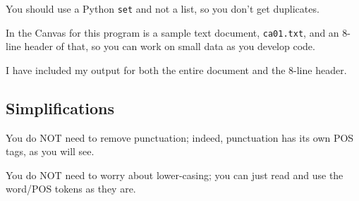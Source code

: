 You should use a Python {\tt set} and not a list, so you don't get
duplicates.

In the Canvas for this program is a sample text document, {\tt ca01.txt},
and an 8-line header of that, so you can work on small data as you
develop code.

I have included my output for both the entire document and the 8-line header.

\subsection*{Simplifications}
You do NOT need to remove punctuation;
indeed, punctuation has its own POS tags, as you will see.

You do NOT need to worry about lower-casing;
you can just read and use the word/POS tokens as they are.

